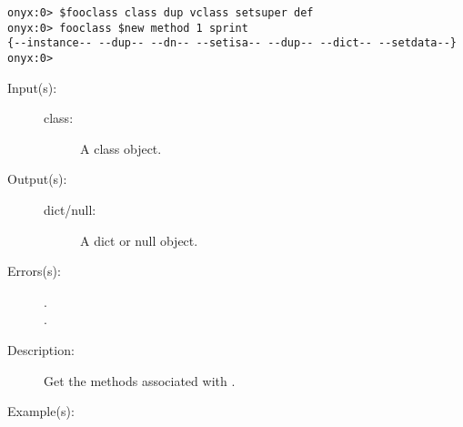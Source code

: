 \begin{description}
\begin{description}
\begin{verbatim}
onyx:0> $fooclass class dup vclass setsuper def
onyx:0> fooclass $new method 1 sprint
{--instance-- --dup-- --dn-- --setisa-- --dup-- --dict-- --setdata--}
onyx:0>
		\end{verbatim}
	\end{description}
\label{systemdict:methods}
\item[{\onyxop{class}{methods}{dict/null}}: ]
	\begin{description}\item[]
	\item[Input(s): ]
		\begin{description}\item[]
		\item[class: ]
			A class object.
		\end{description}
	\item[Output(s): ]
		\begin{description}\item[]
		\item[dict/null: ]
			A dict or null object.
		\end{description}
	\item[Errors(s): ]
		\begin{description}\item[]
		\item[.]
		\item[.]
		\end{description}
	\item[Description: ]
		Get the methods associated with .
	\item[Example(s): ]\begin{verbatim}


\end{verbatim}
\end{description}
\end{description}
